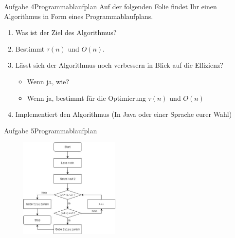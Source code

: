 \begin{frame}{Aufgabe 4}{Programmablaufplan}
Auf der folgenden Folie findet Ihr einen Algorithmus in Form eines Programmablaufplans. 
\begin{enumerate}
    \item Was ist der Ziel des Algorithmus?
    \item Bestimmt $\tau(n)$ und $O(n)$.
    \item Lässt sich der Algorithmus noch verbessern in Blick auf die Effizienz?
    \begin{itemize}
        \item Wenn ja, wie?
        \item Wenn ja, bestimmt für die Optimierung $\tau(n)$ und $O(n)$
    \end{itemize}
    \item Implementiert den Algorithmus (In Java oder einer Sprache eurer Wahl)
\end{enumerate}
\end{frame}

\begin{frame}{Aufgabe 5}{Programmablaufplan}
\begin{figure}
    \includegraphics[height=5cm]{graph/pap_excercise_algo}
\end{figure}
\end{frame}